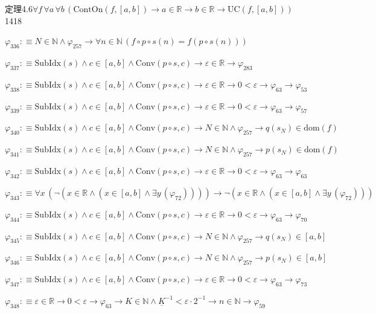 \begin{fullproof}{定理4.6}{$\forall f\,\forall a\,\forall b\,(\mathrm{ContOn}(f,[a,b]) \to a \in \mathbb{R} \to b \in \mathbb{R} \to \mathrm{UC}(f,[a,b]))$}{1418}
\begin{abbrevlist}
\item $\varphi_{336} :\equiv N \in \mathbb{N} \land \varphi_{257} \to \forall n \in \mathbb{N}\,(f \circ p \circ s(n) = f(p \circ s(n)))$
\item $\varphi_{337} :\equiv \mathrm{SubIdx}(s) \land c \in [a,b] \land \mathrm{Conv}(p \circ s,c) \to \varepsilon \in \mathbb{R} \to \varphi_{283}$
\item $\varphi_{338} :\equiv \mathrm{SubIdx}(s) \land c \in [a,b] \land \mathrm{Conv}(p \circ s,c) \to \varepsilon \in \mathbb{R} \to 0 < \varepsilon \to \varphi_{63} \to \varphi_{53}$
\item $\varphi_{339} :\equiv \mathrm{SubIdx}(s) \land c \in [a,b] \land \mathrm{Conv}(p \circ s,c) \to \varepsilon \in \mathbb{R} \to 0 < \varepsilon \to \varphi_{63} \to \varphi_{57}$
\item $\varphi_{340} :\equiv \mathrm{SubIdx}(s) \land c \in [a,b] \land \mathrm{Conv}(p \circ s,c) \to N \in \mathbb{N} \land \varphi_{257} \to q(s_{N}) \in \mathrm{dom}(f)$
\item $\varphi_{341} :\equiv \mathrm{SubIdx}(s) \land c \in [a,b] \land \mathrm{Conv}(p \circ s,c) \to N \in \mathbb{N} \land \varphi_{257} \to p(s_{N}) \in \mathrm{dom}(f)$
\item $\varphi_{342} :\equiv \mathrm{SubIdx}(s) \land c \in [a,b] \land \mathrm{Conv}(p \circ s,c) \to \varepsilon \in \mathbb{R} \to 0 < \varepsilon \to \varphi_{63} \to \varphi_{63}$
\item $\varphi_{343} :\equiv \forall x\,(\neg (x \in \mathbb{R} \land (x \in [a,b] \land \exists y\,(\varphi_{72})))) \to \neg (x \in \mathbb{R} \land (x \in [a,b] \land \exists y\,(\varphi_{72})))$
\item $\varphi_{344} :\equiv \mathrm{SubIdx}(s) \land c \in [a,b] \land \mathrm{Conv}(p \circ s,c) \to \varepsilon \in \mathbb{R} \to 0 < \varepsilon \to \varphi_{63} \to \varphi_{70}$
\item $\varphi_{345} :\equiv \mathrm{SubIdx}(s) \land c \in [a,b] \land \mathrm{Conv}(p \circ s,c) \to N \in \mathbb{N} \land \varphi_{257} \to q(s_{N}) \in [a,b]$
\item $\varphi_{346} :\equiv \mathrm{SubIdx}(s) \land c \in [a,b] \land \mathrm{Conv}(p \circ s,c) \to N \in \mathbb{N} \land \varphi_{257} \to p(s_{N}) \in [a,b]$
\item $\varphi_{347} :\equiv \mathrm{SubIdx}(s) \land c \in [a,b] \land \mathrm{Conv}(p \circ s,c) \to \varepsilon \in \mathbb{R} \to 0 < \varepsilon \to \varphi_{63} \to \varphi_{73}$
\item $\varphi_{348} :\equiv \varepsilon \in \mathbb{R} \to 0 < \varepsilon \to \varphi_{63} \to K \in \mathbb{N} \land \underline{K}^{-1} < \varepsilon \cdot 2^{-1} \to n \in \mathbb{N} \to \varphi_{59}$

\end{abbrevlist}
\end{fullproof}
